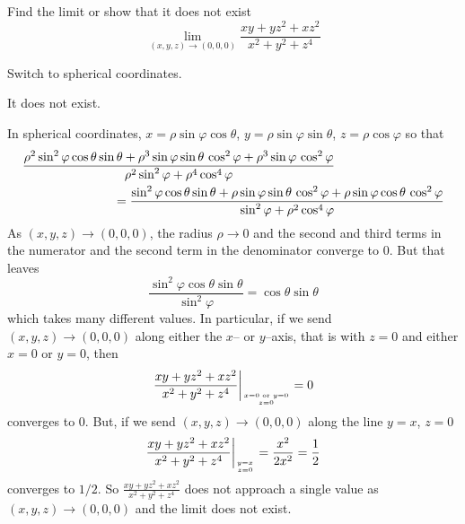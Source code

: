 \subsection*{\Application}

\begin{question}[M253 2010D] %
Find the limit or show that it does not exist
\begin{equation*}
\lim_{(x,y,z)\to(0,0,0)}\frac{xy+yz^2+xz^2}{x^2+y^2+z^4}
\end{equation*}

\end{question}

\begin{hint}
Switch to spherical coordinates.
\end{hint}

\begin{answer}
It does not exist.
\end{answer}

\begin{solution}
In spherical coordinates, $x=\rho\sin\varphi\cos\theta$, 
$y=\rho\sin\varphi\sin\theta$, $z=\rho\cos\varphi$ so that 
\begin{align*}
&\frac{\rho^2\sin^2\varphi\cos\theta\sin\theta
      +\rho^3\sin\varphi\sin\theta\,\cos^2\varphi
      +\rho^3\sin\varphi\,\cos^2\varphi}
     {\rho^2\sin^2\varphi+\rho^4\cos^4\varphi} \\
&\hskip1in 
=\frac{\sin^2\varphi\cos\theta\sin\theta
      +\rho\sin\varphi\sin\theta\,\cos^2\varphi
      +\rho\sin\varphi\cos\theta\,\cos^2\varphi}
     {\sin^2\varphi+\rho^2\cos^4\varphi}
\end{align*}
As $(x,y,z)\to (0,0,0)$, the radius $\rho\to 0$ and the second and third terms 
in the numerator and the second term in the denominator converge to $0$.
But that leaves
\begin{equation*}
\frac{\sin^2\varphi\cos\theta\sin\theta}{\sin^2\varphi}
=\cos\theta\sin\theta
\end{equation*}
which takes many different values. In particular, if we send 
$(x,y,z)\to (0,0,0)$ along either the $x$-- or $y$--axis,
that is with $z=0$ and either $x=0$ or $y=0$, then
\begin{equation*}
\frac{xy+yz^2+xz^2}{x^2+y^2+z^4}\bigg|_{\Atop{x=0\text{ or }y=0}{z=0}}=0
\end{equation*}
converges to $0$. But, if we send 
$(x,y,z)\to (0,0,0)$ along the line $y=x$, $z=0$
\begin{equation*}
\frac{xy+yz^2+xz^2}{x^2+y^2+z^4}\bigg|_{\Atop{y=x}{z=0}}=\frac{x^2}{2x^2}
=\frac{1}{2}
\end{equation*}
converges to $1/2$. So $\frac{xy+yz^2+xz^2}{x^2+y^2+z^4}$ does not 
approach a single value as  $(x,y,z)\to(0,0,0)$ and the limit does not exist.
\end{solution}

